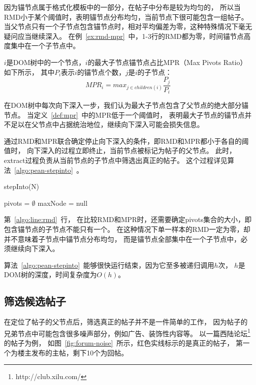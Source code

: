 因为锚节点属于格式化模板中的一部分，在帖子中分布是较为均匀的，
所以当RMD小于某个阈值时，表明锚节点分布均匀，当前节点下很可能包含一组帖子。
当父节点只有一个子节点包含锚节点时，相对平均偏差为零，这种特殊情况下毫无疑问应当继续深入。
在例~\ref{ex:rmd-mpr}~中，1-3行的RMD都为零，时间锚节点高度集中在一个子节点中。

\begin{definition}
\label{def:mpr}
$i$是DOM树中的一个节点，$i$的最大子节点锚节点占比MPR（Max Pivots Ratio）如下所示，
其中$P_i$表示$i$的锚节点个数，$j$是$i$的子节点：
\begin{equation}
MPR_i = max_{j \in children(i)} \frac{P_j}{P_i}
\end{equation}
\end{definition}

在DOM树中每次向下深入一步，我们认为最大子节点包含了父节点的绝大部分锚节点。
当定义~\ref{def:mpr}~中的MPR低于一个阈值时，
表明最大子节点的锚节点并不足以在父节点中占据统治地位，继续向下深入可能会损失信息。

通过RMD和MPR联合确定停止向下深入的条件，即RMD和MPR都小于各自的阈值时，
向下深入的过程立即终止，当前节点被标记为帖子的父节点。
此时，extract过程负责从当前节点的子节点中筛选出真正的帖子。
这个过程详见算法~\ref{algo:pean-stepinto}~。

\begin{algorithm}[t]
\caption{stepInto(N)}
\label{algo:pean-stepinto}

pivots = $\emptyset$ \;
maxNode = null \;

\end{algorithm}

第~\ref{algo:line:rmd}~行，
在比较RMD和MPR时，还需要确定pivots集合的大小，即包含锚节点的子节点不能只有一个。
在这种情况下单一样本的RMD一定为零，却并不意味着子节点中锚节点分布均匀，
而是锚节点全部集中在一个子节点中，必须继续向下深入。

算法~\ref{algo:pean-stepinto}~能够很快运行结束，因为它至多被递归调用$h$次，
$h$是DOM树的深度，时间复杂度为$O(h)$。

\subsection{筛选候选帖子}
在定位了帖子的父节点后，筛选真正的帖子并不是一件简单的工作，
因为帖子的兄弟节点中可能包含很多噪声部分，例如广告、装饰性内容等。
以一篇西陆论坛\footnote{http://club.xilu.com/}的帖子为例，
如图~\ref{fig:forum-noise}~所示，红色实线标示的是真正的帖子，
第一个为楼主发布的主帖，剩下10个为回帖。

